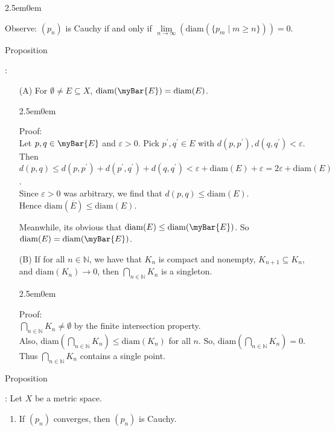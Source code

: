 \documentclass{book}
\newcommand{\hTwo}{%
   \color{MidnightBlue}%
   \fontsize{13}{15}\selectfont%
}
\newcommand{\hThree}{%
   \color{PineGreen}
   \fontsize{13}{15}\selectfont%
}
\newcommand{\exOne}{%
   \color{Purple}%
   \fontsize{14}{16}\selectfont%
}
\newenvironment{myIndent}{%
   \begin{adjustwidth}{2.5em}{0em}%
}{%
   \end{adjustwidth}%
}
\newcommand{\retTwo}{\hfill\bigbreak}
\newcommand{\diam}[1]{\mathrm{diam}(#1)}
\newcounter{PropNumber}
\newcommand{\propCount}[1][1]{%
   \addtocounter{PropNumber}{#1}%
   \thePropNumber%
}
\begin{document}
   {\begin{myIndent} \exOne
      Observe: $(p_n)$ is Cauchy if and only if $\lim\limits_{n\rightarrow\infty}{(\diam{\{p_m \mid m \geq n\}})} = 0$.

      \newpage

      \hTwo
      Proposition \propCount:
      \begin{itemize}
         \item[(A)] For $\emptyset \neq E \subseteq X$, $\diam{\myBar{E}} = \diam{E}$.
         
         {\begin{myIndent} \hThree
            Proof:\\
            Let $p, q \in \myBar{E}$ and $\varepsilon > 0$. Pick $p^\prime, q^\prime \in E$ with $d(p, p^\prime), d(q, q^\prime) < \varepsilon$. Then $d(p, q) \leq d(p, p^\prime) + d(p^\prime, q^\prime) + d(q, q^\prime) < \varepsilon + \diam{E} + \varepsilon = 2\varepsilon + \diam{E}$.\\ Since $\varepsilon > 0$ was arbitrary, we find that $d(p, q) \leq \diam{E}$.\\ Hence $\diam{\overbar{E}} \leq \diam{E}$. \retTwo

            Meanwhile, its obvious that $\diam{E} \leq \diam{\myBar{E}}$. So $\diam{E} = \diam{\myBar{E}}$.
            \retTwo
         \end{myIndent}}

         \item[(B)] If for all $n \in \mathbb{N}$, we have that $K_n$ is compact and nonempty, $K_{n+1} \subseteq K_n$, and $\diam{K_n} \rightarrow 0$, then $\bigcap\limits_{n \in \mathbb{N}}{K_n}$ is a singleton.
         
         {\begin{myIndent} \hThree
            Proof:\\ [1pt]
            ${\displaystyle \bigcap\limits_{n\in\mathbb{N}}{K_n}} \neq \emptyset$ by the finite intersection property.\\ Also, $\diam{{\displaystyle \bigcap\limits_{n\in\mathbb{N}}{K_n}}} \leq \diam{K_n}$ for all $n$. So, $\diam{{\displaystyle \bigcap\limits_{n\in\mathbb{N}}{K_n}}} = 0$.\\
            Thus ${\displaystyle \bigcap\limits_{n\in\mathbb{N}}{K_n}}$ contains a single point.
            \retTwo
         \end{myIndent}}
      \end{itemize}

      Proposition \propCount: Let $X$ be a metric space.
      \begin{enumerate}
         \item If $(p_n)$ converges, then $(p_n)$ is Cauchy.
         

\end{enumerate}
\end{myIndent}}
\end{document}
